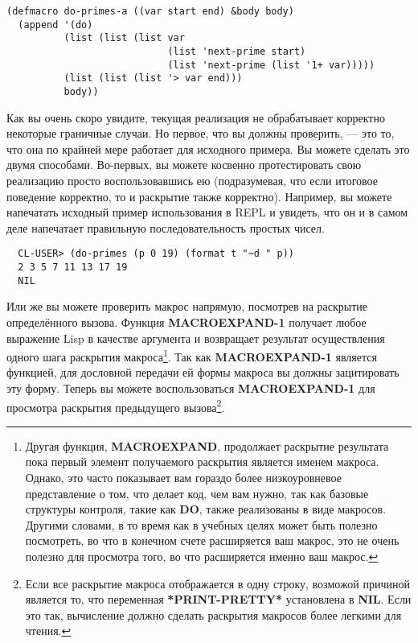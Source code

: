 \begin{lstlisting}
(defmacro do-primes-a ((var start end) &body body)
  (append '(do)
          (list (list (list var
                            (list 'next-prime start)
                            (list 'next-prime (list '1+ var)))))
          (list (list (list '> var end)))
          body))
\end{lstlisting}

Как вы очень скоро увидите, текущая реализация  не обрабатывает корректно
некоторые граничные случаи. Но первое, что вы должны проверить, --- это то, что она по
крайней мере работает для исходного примера. Вы можете сделать это двумя
способами. Во-первых, вы можете косвенно протестировать свою реализацию просто
воспользовавшись ею (подразумевая, что если итоговое поведение корректно, то и раскрытие
также корректно). Например, вы можете напечатать исходный пример использования
 в REPL и увидеть, что он и в самом деле напечатает правильную
последовательность простых чисел.

\begin{verbatim}
  CL-USER> (do-primes (p 0 19) (format t "~d " p))
  2 3 5 7 11 13 17 19
  NIL
\end{verbatim}

Или же вы можете проверить макрос напрямую, посмотрев на раскрытие определённого
вызова. Функция \textbf{MACROEXPAND-1} получает любое выражение Lisp в качестве аргумента
и возвращает результат осуществления одного шага раскрытия макроса\footnote{Другая
  функция, \textbf{MACROEXPAND}, продолжает раскрытие результата пока первый элемент
  получаемого раскрытия является именем макроса. Однако, это часто показывает вам гораздо
  более низкоуровневое представление о том, что делает код, чем вам нужно, так как базовые
  структуры контроля, такие как \textbf{DO}, также реализованы в виде макросов. Другими
  словами, в то время как в учебных целях может быть полезно посмотреть, во что в конечном
  счете расширяется ваш макрос, это не очень полезно для просмотра того, во что
  расширяется именно ваш макрос.}. Так как \textbf{MACROEXPAND-1} является функцией, для
дословной передачи ей формы макроса вы должны зацитировать эту форму. Теперь вы можете
воспользоваться \textbf{MACROEXPAND-1} для просмотра раскрытия предыдущего
вызова\footnote{Если все раскрытие макроса отображается в одну строку, возможой причиной
  является то, что переменная \textbf{ *PRINT-PRETTY* } установлена в \textbf{NIL}. Если
  это так, вычисление  должно сделать раскрытия макросов
  более легкими для чтения.}.

